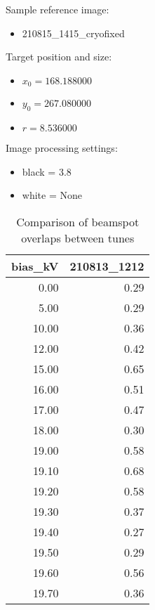 Sample reference image:
    \begin{itemize}[noitemsep]
        \item 210815\_1415\_cryofixed
    \end{itemize}
    
Target position and size:
    \begin{itemize}[noitemsep]
        \item $x_0 = 168.188000$
        \item $y_0 = 267.080000$
        \item $r = 8.536000$
    \end{itemize}
    
Image processing settings:
    \begin{itemize}[noitemsep]
        \item black = 3.8
        \item white = None
    \end{itemize}
    
\listoftables
\listoffigures
\begin{table}[H]
\centering
\caption{Comparison of beamspot overlaps between tunes}
\label{compare_table}
\begin{tabular}{rr}
\toprule
 bias\_kV &  210813\_1212 \\
\midrule
    0.00 &         0.29 \\
    5.00 &         0.29 \\
   10.00 &         0.36 \\
   12.00 &         0.42 \\
   15.00 &         0.65 \\
   16.00 &         0.51 \\
   17.00 &         0.47 \\
   18.00 &         0.30 \\
   19.00 &         0.58 \\
   19.10 &         0.68 \\
   19.20 &         0.58 \\
   19.30 &         0.37 \\
   19.40 &         0.27 \\
   19.50 &         0.29 \\
   19.60 &         0.56 \\
   19.70 &         0.36 \\
\bottomrule
\end{tabular}
\end{table}


